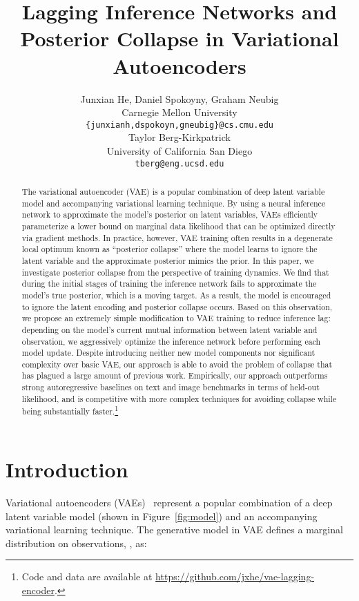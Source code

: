 \documentclass{article} \usepackage{iclr2019_conference,times}
\title{Lagging Inference Networks and Posterior Collapse in Variational Autoencoders}
\author{Junxian He, Daniel Spokoyny, Graham Neubig \\
Carnegie Mellon University\\
\texttt{\{junxianh,dspokoyn,gneubig\}@cs.cmu.edu} \\
\And
Taylor Berg-Kirkpatrick \\
University of California San Diego\\
\texttt{tberg@eng.ucsd.edu} 
}
\begin{document}
\maketitle

\begin{abstract}
The variational autoencoder (VAE) is a popular combination of deep latent variable model and accompanying variational learning technique. By using a neural inference network to approximate the model's posterior on latent variables, VAEs efficiently parameterize a lower bound on marginal data likelihood that can be optimized directly via gradient methods.
In practice, however, VAE training often results in a degenerate local optimum known as ``posterior collapse''
where the model learns to ignore the latent variable and the approximate posterior mimics the prior.
In this paper, we investigate posterior collapse from the perspective of training dynamics. We find that during the initial stages of training the inference network fails to approximate the model's true posterior, which is a moving target. As a result, the model is encouraged to ignore the latent encoding and posterior collapse occurs.
Based on this observation, we propose an extremely simple modification to VAE training to reduce inference lag: depending on the model's current mutual information between latent variable and observation, we aggressively optimize the inference network before performing each model update. Despite introducing neither new model components nor significant complexity over basic VAE, our approach is able to avoid the problem of collapse that has plagued a large amount of previous work.
Empirically, our approach outperforms strong autoregressive baselines on text and image benchmarks in terms of held-out likelihood, and is competitive with more complex techniques for avoiding collapse while being substantially faster.\footnote{Code and data are available at \href{https://github.com/jxhe/vae-lagging-encoder}{https://github.com/jxhe/vae-lagging-encoder}.}
\end{abstract}


\section{Introduction}
Variational autoencoders (VAEs)~\citep{kingma2013auto} represent a popular combination of a deep latent variable model 
(shown in Figure~\ref{fig:model}) and an accompanying variational learning technique. The generative model in VAE defines a marginal distribution on observations, , as:
\end{document}
